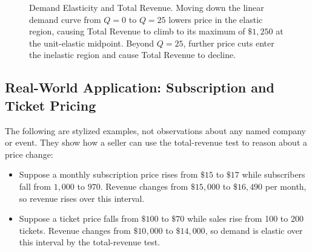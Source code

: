 \documentclass[11pt,letterpaper]{article}
\begin{document}
\begin{figure}[htbp]
\caption{Demand Elasticity and Total Revenue. Moving down the linear demand curve from $Q=0$ to $Q=25$ lowers price in the elastic region, causing Total Revenue to climb to its maximum of $\$1{,}250$ at the unit-elastic midpoint. Beyond $Q=25$, further price cuts enter the inelastic region and cause Total Revenue to decline.}
\label{fig:total_revenue_curve}
\end{figure}

\subsection*{Real-World Application: Subscription and Ticket Pricing}
The following are stylized examples, not observations about any named company or event. They show how a seller can use the total-revenue test to reason about a price change:
\begin{itemize}
    \item Suppose a monthly subscription price rises from $\$15$ to $\$17$ while subscribers fall from $1{,}000$ to $970$. Revenue changes from $\$15{,}000$ to $\$16{,}490$ per month, so revenue rises over this interval.
    \item Suppose a ticket price falls from $\$100$ to $\$70$ while sales rise from 100 to 200 tickets. Revenue changes from $\$10{,}000$ to $\$14{,}000$, so demand is elastic over this interval by the total-revenue test.
\end{itemize}
\end{document}
